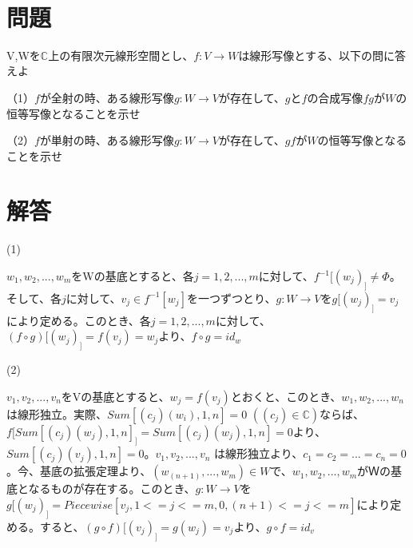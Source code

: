 \documentclass[../main]{subfiles}
\begin{document}
  
  \section{問題}
    V,Wを$\mathbb{C}$上の有限次元線形空間とし、$f:V\rightarrow W$は線形写像とする、以下の問に答えよ
    \par
    （1）$f$が全射の時、ある線形写像$g:W\rightarrow V$が存在して、$g$と$f$の合成写像$fg$が$W$の恒等写像となることを示せ
    \par
    （2）$f$が単射の時、ある線形写像$g:W\rightarrow V$が存在して、$gf$が$W$の恒等写像となることを示せ
  
  \section{解答}
    (1)
    \par
    ${w_1,w_2,...,w_m}$をWの基底とすると、各$j=1,2,...,m$に対して、$f^{-1}[(w_j)_]\ne \Phi$。そして、各$j$に対して、$v_j \in f^{-1}[w_j]$を一つずつとり、$g:W\rightarrow V$を$g[(w_j)_]=v_j$により定める。このとき、各$j=1,2,...,m$に対して、$(f\circ g)[(w_j)_]=f(v_j)=w_j$より、$f\circ g=id_w$ 

    \par
    (2)
    \par
  ${v_1,v_2,...,v_n}$をVの基底とすると、$w_j=f(v_j)$とおくと、このとき、${w_1,w_2,...,w_n}$は線形独立。実際、$Sum[(c_j)(w_i),{1,n}]=0$ $((c_j)\in \mathbb{C})$ならば、$f[Sum[(c_j)(w_j),{1,n}]_]=Sum[(c_j)(w_j),{1,n}]=0$より、$Sum[(c_j)(v_j),{1,n}]=0$。${v_1,v_2,...,v_n}$ は線形独立より、$c_1=c_2=...=c_n=0$。今、基底の拡張定理より、$(w_(n+1),...,w_m)\in W$で、${w_1,w_2,...,w_m}$がＷの基底となるものが存在する。このとき、$g:W\rightarrow V$を$g[(w_j)_]=Piecewise[{v_j,1<=j<=m},{0,(n+1)<=j<=m}]$により定める。すると、$(g\circ f)[(v_j)_]=g(w_j)=v_j$より、$g\circ f=id_v$
  
\end{document}
